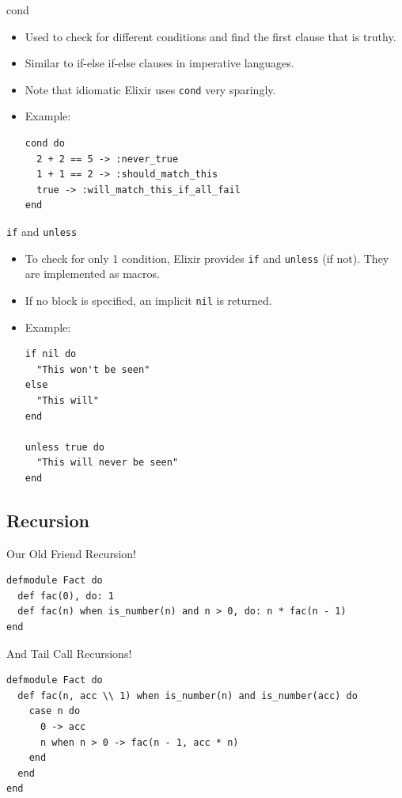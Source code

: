 \documentclass[12pt]{beamer}
\begin{document}
\begin{frame}[fragile]{cond}
  \begin{itemize}
    \item Used to check for different conditions and find the first clause that is truthy.
    \item Similar to if-else if-else clauses in imperative languages.
    \item Note that idiomatic Elixir uses \texttt{cond} very sparingly.
    \item Example:
          \begin{verbatim}
cond do
  2 + 2 == 5 -> :never_true
  1 + 1 == 2 -> :should_match_this
  true -> :will_match_this_if_all_fail
end
  \end{verbatim}
  \end{itemize}
\end{frame}

\begin{frame}[fragile]{\texttt{if} and \texttt{unless}}
  \begin{itemize}
    \item To check for only 1 condition, Elixir provides \texttt{if} and \texttt{unless} (if not). They are implemented as macros.
    \item If no block is specified, an implicit \texttt{nil} is returned.
    \item Example:
          \begin{verbatim}
if nil do
  "This won't be seen"
else
  "This will"
end

unless true do
  "This will never be seen"
end
  \end{verbatim}
  \end{itemize}
\end{frame}

\subsection{Recursion}
\begin{frame}[fragile]{Our Old Friend Recursion!}
  \begin{verbatim}
defmodule Fact do
  def fac(0), do: 1
  def fac(n) when is_number(n) and n > 0, do: n * fac(n - 1)
end
  \end{verbatim}
\end{frame}

\begin{frame}[fragile]{And Tail Call Recursions!}
  \begin{verbatim}
defmodule Fact do
  def fac(n, acc \\ 1) when is_number(n) and is_number(acc) do
    case n do
      0 -> acc
      n when n > 0 -> fac(n - 1, acc * n)
    end
  end
end
  \end{verbatim}
\end{frame}
\end{document}
